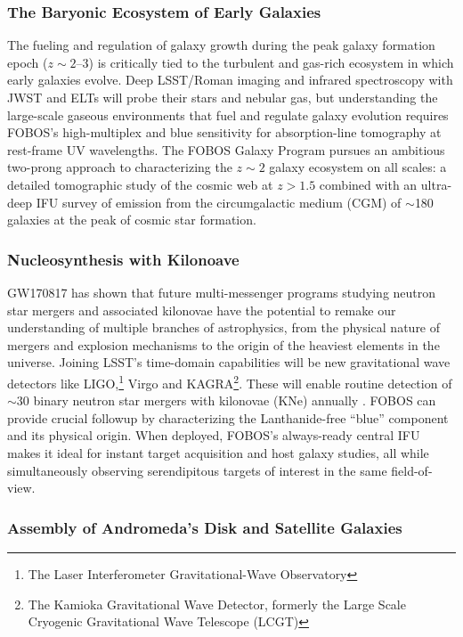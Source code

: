 \documentclass[oneside,11pt]{amsart}
\begin{document}
\subsubsection{The Baryonic Ecosystem of Early Galaxies} 
\label{sec:galaxies}

The fueling and regulation of galaxy growth during the peak galaxy formation epoch ($z \sim2$--3) is critically tied to the turbulent and gas-rich ecosystem in which early galaxies evolve.  Deep LSST/Roman imaging and infrared spectroscopy with JWST and ELTs will probe their stars and nebular gas, but understanding the large-scale gaseous environments that fuel and regulate galaxy evolution requires FOBOS's high-multiplex and blue sensitivity for absorption-line tomography at rest-frame UV wavelengths.  The FOBOS Galaxy Program pursues an ambitious two-prong approach to characterizing the $z \sim 2$ galaxy ecosystem on all scales: a detailed tomographic study of the cosmic web at $z>1.5$ combined with an ultra-deep IFU survey of emission from the circumgalactic medium (CGM) of $\sim$180 galaxies at the peak of cosmic star formation.

\subsubsection{Nucleosynthesis with Kilonoave} 
\label{sec:kilonovae}

GW170817 has shown that future multi-messenger programs studying neutron star mergers and associated kilonovae have the potential to remake our understanding of multiple branches of astrophysics, from the physical nature of mergers and explosion mechanisms to the origin of the heaviest elements in the universe.  Joining LSST's time-domain capabilities will be new gravitational wave detectors like LIGO,\footnote{The Laser Interferometer Gravitational-Wave Observatory} Virgo and KAGRA\footnote{The Kamioka Gravitational Wave Detector, formerly the Large Scale Cryogenic Gravitational Wave Telescope (LCGT)}.  These will enable routine detection of $\sim$30 binary neutron star mergers with kilonovae (KNe) annually \citep{abbott2018prospects}.  FOBOS can provide crucial followup by characterizing the Lanthanide-free ``blue'' component and its physical origin.  When deployed, FOBOS's always-ready central IFU makes it ideal for instant target acquisition and host galaxy studies, all while simultaneously observing serendipitous targets of interest in the same field-of-view. 


\subsubsection{Assembly of Andromeda's Disk and Satellite Galaxies}
\label{sec:localgroup}
\end{document}
